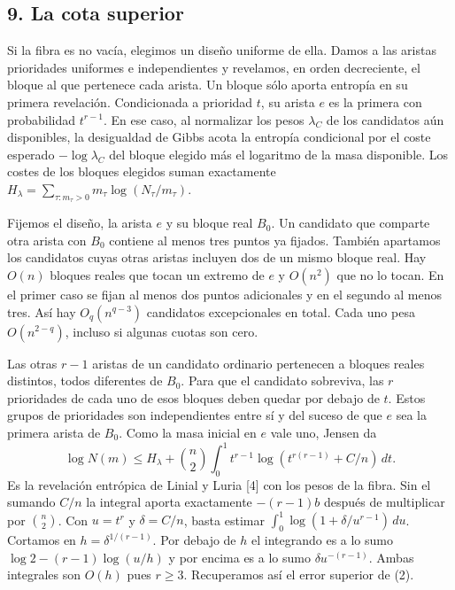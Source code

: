 \documentclass[spanish,11pt,a4paper]{article}
\begin{document}
\subsection{9. La cota superior}\label{la-cota-superior}

Si la fibra es no vacía, elegimos un diseño uniforme de ella. Damos a las aristas prioridades uniformes e independientes y revelamos, en orden decreciente, el bloque al que pertenece cada arista. Un bloque sólo aporta entropía en su primera revelación. Condicionada a prioridad \(t\), su arista \(e\) es la primera con probabilidad \(t^{r-1}\). En ese caso, al normalizar los pesos \(\lambda_C\) de los candidatos aún disponibles, la desigualdad de Gibbs acota la entropía condicional por el coste esperado \(-\log\lambda_C\) del bloque elegido más el logaritmo de la masa disponible. Los costes de los bloques elegidos suman exactamente \(H_\lambda=\sum_{\tau:m_\tau>0}m_\tau\log(N_\tau/m_\tau)\).

Fijemos el diseño, la arista \(e\) y su bloque real \(B_0\). Un candidato que comparte otra arista con \(B_0\) contiene al menos tres puntos ya fijados. También apartamos los candidatos cuyas otras aristas incluyen dos de un mismo bloque real. Hay \(O(n)\) bloques reales que tocan un extremo de \(e\) y \(O(n^2)\) que no lo tocan. En el primer caso se fijan al menos dos puntos adicionales y en el segundo al menos tres. Así hay \(O_q(n^{q-3})\) candidatos excepcionales en total. Cada uno pesa \(O(n^{2-q})\), incluso si algunas cuotas son cero.

Las otras \(r-1\) aristas de un candidato ordinario pertenecen a bloques reales distintos, todos diferentes de \(B_0\). Para que el candidato sobreviva, las \(r\) prioridades de cada uno de esos bloques deben quedar por debajo de \(t\). Estos grupos de prioridades son independientes entre sí y del suceso de que \(e\) sea la primera arista de \(B_0\). Como la masa inicial en \(e\) vale uno, Jensen da \[\log N(m)\le H_\lambda+\binom n2\int_0^1 t^{r-1}
                 \log(t^{r(r-1)}+C/n)\,dt .\] Es la revelación entrópica de Linial y Luria {[}4{]} con los pesos de la fibra. Sin el sumando \(C/n\) la integral aporta exactamente \(-(r-1)b\) después de multiplicar por \(\binom n2\). Con \(u=t^r\) y \(\delta=C/n\), basta estimar \(\int_0^1\log(1+\delta/u^{r-1})\,du\). Cortamos en \(h=\delta^{1/(r-1)}\). Por debajo de \(h\) el integrando es a lo sumo \(\log 2-(r-1)\log(u/h)\) y por encima es a lo sumo \(\delta u^{-(r-1)}\). Ambas integrales son \(O(h)\) pues \(r\ge3\). Recuperamos así el error superior de (2).
\end{document}
